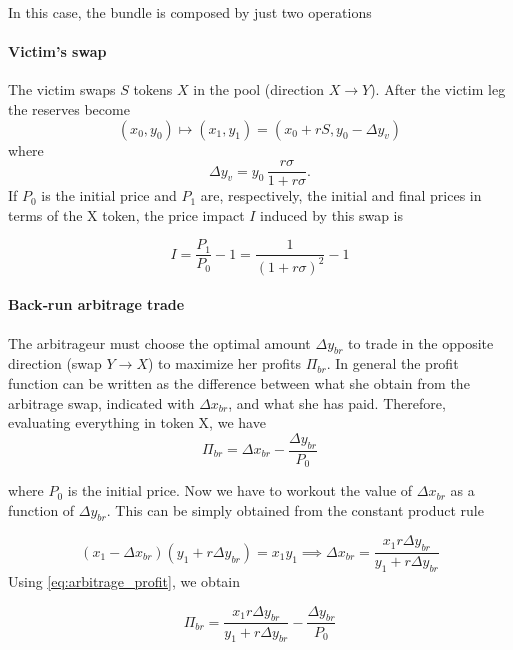 \documentclass[a4paper,11pt]{article}
\begin{document}
In this case, the bundle is composed by just two operations

\paragraph{Victim's swap}
The victim swaps $S$ tokens $X$ in the pool (direction $X\to Y$).
After the victim leg the reserves become
\begin{equation}
    (x_0,y_0) \mapsto (x_1,y_1)=( x_0 + rS, y_0 - \Delta y_v)
\end{equation}
where
\begin{equation}
\Delta y_v
  =y_0\,\frac{r\sigma}{1+r\sigma}.
\end{equation}
If $P_0$ is the initial price and $P_1$ are, respectively, the initial and final prices in terms of the X token, the price impact $I$ induced by this swap is

\begin{equation}
    I = \frac{P_1}{P_0} - 1 = \frac{1}{(1 + r\sigma)^2} - 1
\label{victim_impact}
\end{equation}
\paragraph{ Back‑run arbitrage trade}
The arbitrageur must choose the optimal amount $\Delta y_{br}$ to trade in the opposite direction (swap $Y\to X$) to maximize her profits $\Pi_{br}$. In general the profit function can be written as the difference between what she obtain from the arbitrage swap, indicated with $\Delta x_{br}$, and what she has paid. Therefore, evaluating everything in token X, we have
\begin{equation}
    \Pi_{br} = \Delta x_{br} - \frac{\Delta y_{br}}{P_0}
    \label{eq:arbitrage_profit}
\end{equation}

where $P_0$ is the initial price. Now we have to workout the value of $\Delta x_{br}$ as a function of $\Delta y_{br}$. This can be simply obtained from the constant product rule

\begin{equation}
    (x_1 - \Delta x_{br}) (y_1 + r \Delta y_{br}) = x_1y_1 \implies \Delta x_{br} = \frac{x_1 r \Delta y_{br}}{y_1 + r\Delta y_{br}}
\end{equation}
Using \eqref{eq:arbitrage_profit}, we obtain

\begin{equation}
    \Pi_{br} = \frac{x_1 r \Delta y_{br}}{y_1 + r\Delta y_{br}} - \frac{\Delta y_{br}}{P_0}
    \label{eq:arbitrage_profit1}
\end{equation}
\end{document}
